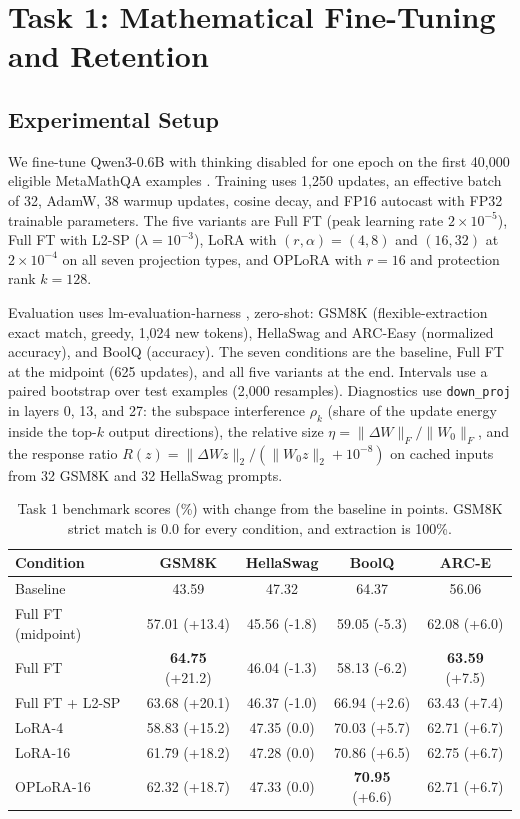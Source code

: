 \documentclass{article}
\begin{document}
\section{Task 1: Mathematical Fine-Tuning and Retention}
\subsection{Experimental Setup}
We fine-tune Qwen3-0.6B \citep{qwen3} with thinking disabled for one epoch on the first 40,000 eligible MetaMathQA examples \citep{yu2024metamath}. Training uses 1,250 updates, an effective batch of 32, AdamW, 38 warmup updates, cosine decay, and FP16 autocast with FP32 trainable parameters. The five variants are Full FT (peak learning rate $2\times10^{-5}$), Full FT with L2-SP ($\lambda=10^{-3}$), LoRA with $(r,\alpha)=(4,8)$ and $(16,32)$ at $2\times10^{-4}$ on all seven projection types, and OPLoRA with $r=16$ and protection rank $k=128$.

Evaluation uses lm-evaluation-harness \citep{gao2024harness}, zero-shot: GSM8K \citep{cobbe2021gsm8k} (flexible-extraction exact match, greedy, 1,024 new tokens), HellaSwag \citep{zellers2019hellaswag} and ARC-Easy \citep{clark2018arc} (normalized accuracy), and BoolQ \citep{clark2019boolq} (accuracy). The seven conditions are the baseline, Full FT at the midpoint (625 updates), and all five variants at the end. Intervals use a paired bootstrap over test examples (2,000 resamples). Diagnostics use \texttt{down\_proj} in layers 0, 13, and 27: the subspace interference $\rho_k$ (share of the update energy inside the top-$k$ output directions), the relative size $\eta=\|\Delta W\|_F/\|W_0\|_F$, and the response ratio $R(z)=\|\Delta W z\|_2/(\|W_0 z\|_2+10^{-8})$ on cached inputs from 32 GSM8K and 32 HellaSwag prompts.

\begin{table}[t]
\centering
\caption{Task 1 benchmark scores (\%) with change from the baseline in points. GSM8K strict match is 0.0 for every condition, and extraction is 100\%.}
\label{tab:t1-bench}
\footnotesize
\begin{tabular}{lcccc}
\toprule
Condition & GSM8K & HellaSwag & BoolQ & ARC-E \\
\midrule
Baseline & 43.59 & 47.32 & 64.37 & 56.06 \\
Full FT (midpoint) & 57.01 (+13.4) & 45.56 (-1.8) & 59.05 (-5.3) & 62.08 (+6.0) \\
Full FT & \textbf{64.75} (+21.2) & 46.04 (-1.3) & 58.13 (-6.2) & \textbf{63.59} (+7.5) \\
Full FT + L2-SP & 63.68 (+20.1) & 46.37 (-1.0) & 66.94 (+2.6) & 63.43 (+7.4) \\
LoRA-4 & 58.83 (+15.2) & 47.35 (0.0) & 70.03 (+5.7) & 62.71 (+6.7) \\
LoRA-16 & 61.79 (+18.2) & 47.28 (0.0) & 70.86 (+6.5) & 62.75 (+6.7) \\
OPLoRA-16 & 62.32 (+18.7) & 47.33 (0.0) & \textbf{70.95} (+6.6) & 62.71 (+6.7) \\
\bottomrule
\end{tabular}
\end{table}
\end{document}
